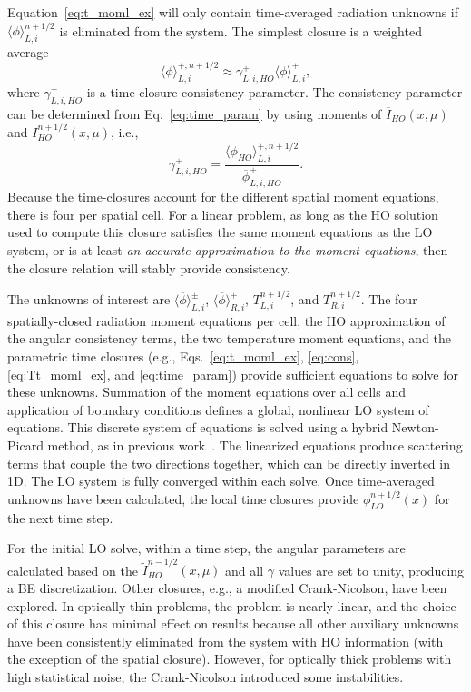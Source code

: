 \documentclass{anstrans}
\newcommand{\mom}[1]{\langle #1 \rangle}
\begin{document}
Equation~\eqref{eq:t_moml_ex} will only contain time-averaged radiation unknowns 
if $\mom{\phi}_{L,i}^{n+1/2}$ is eliminated from the
system.  The simplest closure is a weighted average
\begin{equation}\label{eq:time_param}
    \mom{\phi}_{L,i}^{+,n+1/2} \approx \gamma_{L,i,HO}^+ \mom{\overline{\phi}}_{L,i}^+,
\end{equation}
where $\gamma_{L,i,HO}^+$ is a time-closure consistency parameter.  The consistency
parameter can be determined from Eq.~\eqref{eq:time_param} by using moments of $\overline{I}_{HO}(x,\mu)$ and
$I^{n+1/2}_{HO}(x,\mu)$, i.e.,
\begin{equation}
    \gamma_{L,i,HO}^+ = \frac{\mom{\phi_{HO}}_{L,i}^{+,n+1/2}}{\overline{\phi}_{L,i,HO}^+}.
\end{equation}
Because the time-closures account for the different spatial moment equations, there is four per
spatial cell.  For a linear problem, as long as the HO solution used to compute this closure satisfies the same moment
equations as the LO system, or is at least \emph{an accurate approximation to the moment equations},
then the closure relation will stably provide consistency.

The unknowns of interest are $\mom{\overline{\phi}}_{L,i}^\pm$,
$\mom{\overline{\phi}}_{R,i}^+$, $T_{L,i}^{n+1/2}$, and $T_{R,i}^{n+1/2}$. 
The four spatially-closed radiation moment equations per cell, the HO approximation of the
angular consistency terms, the two temperature moment equations, and the parametric time closures
(e.g., Eqs.~\eqref{eq:t_moml_ex}, \eqref{eq:cons}, \eqref{eq:Tt_moml_ex},
and \eqref{eq:time_param}) provide sufficient equations to solve for these unknowns.  Summation of the
moment equations over all cells and application of boundary conditions defines a global, nonlinear
LO system of equations.  This discrete system of equations is solved using a hybrid Newton-Picard method, as in
previous work~\cite{bolding_nse}. The linearized equations produce scattering terms that couple the
two directions together, which can be directly inverted in 1D.  The LO system is fully converged within each solve.
Once time-averaged unknowns have been calculated, the local time closures provide
$\phi_{LO}^{n+1/2}(x)$ for the next time step.   

For the initial LO solve, within a time step, the angular parameters
are calculated based on the $\tilde I_{HO}^{n-1/2}(x,\mu)$ and all $\gamma$ values 
are set to unity, producing a BE discretization.
Other closures, e.g., a modified Crank-Nicolson, have been explored.  In optically 
thin problems, the problem is nearly linear, and the choice of this closure has minimal
effect on results because all other auxiliary unknowns have been consistently eliminated from the system
with HO information (with the exception of the spatial closure).  However, for optically thick
problems with high statistical noise, the Crank-Nicolson introduced some instabilities.
\end{document}
